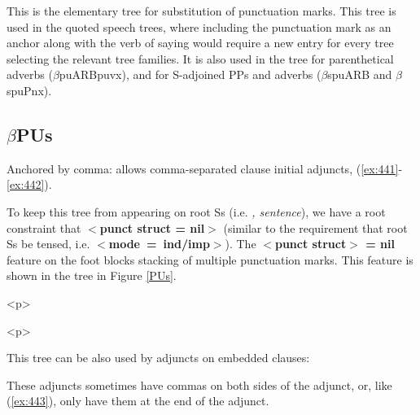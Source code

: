 This is the elementary tree for substitution of punctuation 
marks. This tree is used in the quoted speech trees, where including 
the punctuation mark as an anchor along with the verb of saying would 
require a new entry for every tree selecting the relevant tree 
families. It is also used in the tree for parenthetical adverbs 
($\beta$puARBpuvx), and for S-adjoined PPs and adverbs ($\beta$spuARB 
and $\beta$spuPnx). 
 
\subsection{$\beta$PUs} 
 
Anchored by comma: allows comma-separated clause initial adjuncts, 
(\ref{ex:441}-\ref{ex:442}). 
 
\beginsentences
{}\label{ex:441} 
\endsentences

 
\beginsentences
{}\label{ex:442} 
\endsentences

 
To keep this tree from appearing on root Ss (i.e. {\it , sentence}), 
we have a root constraint that {\bf $<$punct struct = nil$>$} (similar 
to the requirement that root Ss be tensed, i.e. {\bf $<$mode~=~ind/imp$>$}).  The {\bf $<$punct struct$>$ = nil} feature on the foot 
blocks stacking of multiple punctuation marks. This feature is shown 
in the tree in Figure \ref{PUs}. 
 
\begin{rawhtml} <p> \end{rawhtml}
\centering 
\hspace{0.0in} 
\begin{rawhtml} <dl> <dt>{$\beta$PUs, with features displayed <p> </dl> \end{rawhtml}
\label{PUs} 
\begin{rawhtml} <p> \end{rawhtml}
 
This tree can be also used by adjuncts on embedded clauses: 
 
\beginsentences
{}\label{ex:443} 
\endsentences

 
These adjuncts sometimes have commas on both sides of the adjunct, or, 
like (\ref{ex:443}), only have them at the end of the adjunct. 
 
